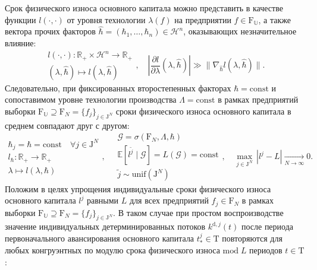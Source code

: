 Срок физического износа основного капитала можно представить в качестве функции $l(\cdot, \cdot)$ от уровня технологии $\lambda(f)$ на предприятии $f \in \mathrm{F}_{\mathbb{U}}$, а также вектора прочих факторов $\hat{\hbar} = (\hbar_1, \dots, \hbar_n) \in \mathcal{H}^{n}$, оказывающих незначительное влияние:
\begin{equation}\begin{aligned} l(\cdot, \cdot) : \mathbb{R}_{+} \times \mathcal{H}^{n} \longrightarrow \mathbb{R}_{+} \\ (\lambda, \hat{\hbar}) \longmapsto l(\lambda, \hat{\hbar}) \end{aligned}, \quad \left| \frac{\partial l}{\partial \lambda} (\lambda, \hat{\hbar}) \right| \gg \|\nabla_{\hat{\hbar}} l(\lambda, \hat{\hbar})\|.\end{equation}
Следовательно, при фиксированных второстепенных факторах $\hbar = \mathrm{const}$ и сопоставимом уровне технологии производства $\Lambda = \mathrm{const}$ в рамках предприятий выборки $\mathrm{F}_{\mathbb{U}} \supseteq \mathrm F_N = \{f_j\}_{j \in \mathrm{J}^{N}}$ сроки физического износа основного капитала в среднем совпадают друг с другом:
\begin{equation}\begin{aligned} \hbar_j = \hbar = \mathrm{const} \quad \forall j \in \mathrm{J}^{N}\\ l_{\hbar} : \mathbb{R}_{+} \longrightarrow \mathbb{R}_{+} \\ \lambda \longmapsto l(\lambda, \hbar)  \end{aligned}, \quad \begin{aligned} \mathcal{G} = \sigma(\mathrm{F}_{N}, \Lambda, \hbar)\\ \mathbb E[l^{\tilde{j}}\mid\mathcal G]=L(\mathcal G) = \mathrm{const}\\ \tilde{j} \sim \mathrm{unif}(\mathrm{J}^{N})\end{aligned}, \quad \max_{j\in \mathrm{J}^{N}}\,|l^{j}-L|\xrightarrow[N\to\infty]{}0.\end{equation}
Положим в целях упрощения индивидуальные сроки физического износа основного капитала $l^{j}$ равными $L$ для всех предприятий $f_j \in \mathrm{F}_{N}$ в рамках выборки $\mathrm{F}_{\mathbb{U}} \supseteq \mathrm F_N = \{f_j\}_{j \in \mathrm{J}^{N}}$. В таком случае при простом воспроизводстве значение индивидуальных детерминированных потоков $k^{\mathrm{d},j}(t)$ после периода первоначального авансирования основного капитала $t^{j}_{*} \in \mathrm{T}$ повторяются для любых конгруэнтных по модулю срока физического износа $\mathrm{mod} \; L$ периодов $t \in \mathrm{T}$:
